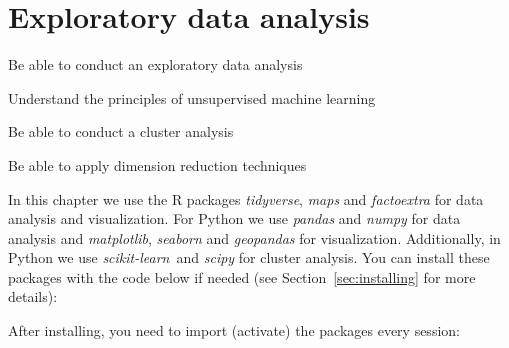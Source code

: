 \chapter{Exploratory data analysis}
\label{chap:eda}

\begin{abstract}{Abstract} This chapter explains how to use data analysis and visualization techniques to understand and communicate the structure and story of our data.  It first introduces the reader to exploratory statistics and data visualization in R and Python. Then, it discusses how unsupervised machine learning, in particular clustering and dimensionality reduction techniques, can be used to group similar cases or to decrease the number of features in a dataset.
\end{abstract}



\begin{objectives}
\item Be able to conduct an exploratory data analysis
\item Understand the principles of unsupervised machine learning
\item Be able to conduct a cluster analysis
\item Be able to apply dimension reduction techniques
\end{objectives}

\newpage
\begin{feature}

In this chapter we use the R packages \emph{tidyverse}, \emph{maps} and \emph{factoextra} for data analysis and visualization. For Python we use \emph{pandas} and \emph{numpy} for data analysis and \emph{matplotlib}, \emph{seaborn} and \emph{geopandas} for visualization. Additionally, in Python we use \emph{scikit-learn}\ and \emph{scipy} for cluster analysis. You can install these packages with the code below if needed
  (see Section~\ref{sec:installing} for more details):


\noindent After installing, you need to import (activate) the packages every session:


\end{feature}



